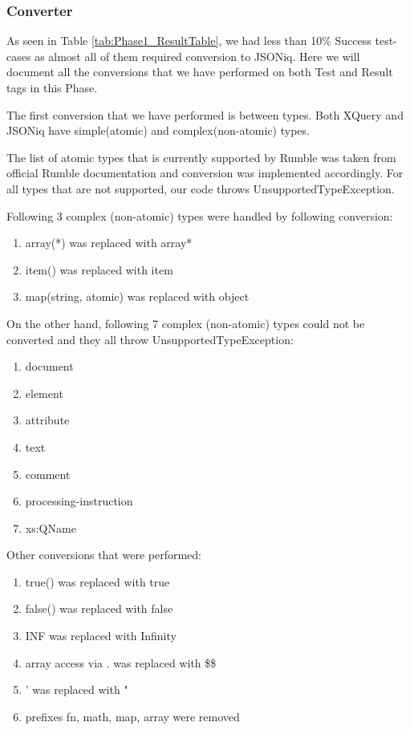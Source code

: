\subsubsection{Converter}
\label{Phase2_Converter}
As seen in Table \ref{tab:Phase1_ResultTable}, we had less than 10\% Success test-cases as almost all of them required conversion to JSONiq. Here we will document all the conversions that we have performed on both Test and Result tags in this Phase. 

The first conversion that we have performed is between types. Both XQuery and JSONiq have simple(atomic) and complex(non-atomic) types. 

The list of atomic types that is currently supported by Rumble was taken from official Rumble documentation \cite{RumbleSupportedTypes} and conversion was implemented accordingly. For all types that are not supported, our code throws UnsupportedTypeException. 

Following 3 complex (non-atomic) types were handled by following conversion:
\begin{enumerate}
	\item array(*) was replaced with array*
	\item item() was replaced with item
	\item map(string, atomic) was replaced with object 
\end{enumerate}

On the other hand, following 7 complex (non-atomic) types could not be converted and they all throw UnsupportedTypeException:
\begin{enumerate}
	\item document
	\item element
	\item attribute
	\item text
	\item comment
	\item processing-instruction
	\item xs:QName
\end{enumerate}

Other conversions that were performed:
\begin{enumerate}
	\item true() was replaced with true
	\item false() was replaced with false
	\item INF was replaced with Infinity
	\item array access via . was replaced with \$\$
	\item ' was replaced with "
	\item prefixes fn, math, map, array were removed
\end{enumerate}

